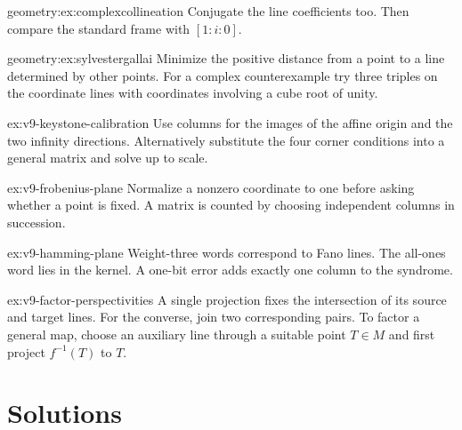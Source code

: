 \begin{hint}{geometry:ex:complexcollineation}
Conjugate the line coefficients too. Then compare the standard frame with $[1:i:0]$.
\end{hint}
\begin{hint}{geometry:ex:sylvestergallai}
Minimize the positive distance from a point to a line determined by other points. For a complex counterexample try three triples on the coordinate lines with coordinates involving a cube root of unity.
\end{hint}
\begin{hint}{ex:v9-keystone-calibration}
Use columns for the images of the affine origin and the two infinity directions. Alternatively substitute the four corner conditions into a general matrix and solve up to scale.
\end{hint}
\begin{hint}{ex:v9-frobenius-plane}
Normalize a nonzero coordinate to one before asking whether a point is fixed. A matrix is counted by choosing independent columns in succession.
\end{hint}
\begin{hint}{ex:v9-hamming-plane}
Weight-three words correspond to Fano lines. The all-ones word lies in the kernel. A one-bit error adds exactly one column to the syndrome.
\end{hint}
\begin{hint}{ex:v9-factor-perspectivities}
A single projection fixes the intersection of its source and target lines. For the converse, join two corresponding pairs. To factor a general map, choose an auxiliary line through a suitable point $T\in M$ and first project $f^{-1}(T)$ to $T$.
\end{hint}

\section{Solutions}

